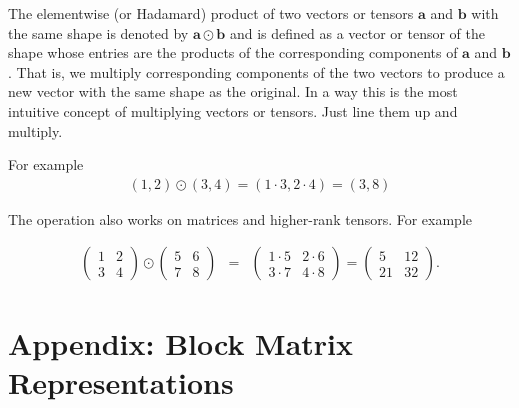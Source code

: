 The elementwise (or Hadamard) product of two vectors or tensors $\mathbf{a}$ and $\mathbf{b}$ with the same shape is denoted by $\mathbf{a} \odot \mathbf{b}$ and is defined as a vector or tensor of the shape whose entries are the products of the corresponding components of $\mathbf{a}$  and $\mathbf{b}$. That is, we multiply corresponding components of the two vectors to produce a new vector with the same shape as the original. In a way this is the most intuitive concept of multiplying vectors or tensors. Just line them up and multiply.

For example
\begin{eqnarray}
(1,2) \odot (3,4) = (1 \cdot 3,  2 \cdot 4) =  (3,8)
\end{eqnarray}

The operation also works on matrices and higher-rank tensors. For example

\begin{eqnarray}
\begin{pmatrix} 1 & 2 \\ 3 & 4 \end{pmatrix} \odot \begin{pmatrix} 5 & 6 \\ 7 & 8 \end{pmatrix} &=& \begin{pmatrix} 1 \cdot 5 & 2 \cdot 6 \\ 3 \cdot 7 & 4 \cdot 8 \end{pmatrix} = \begin{pmatrix} 5 & 12 \\ 21 & 32 \end{pmatrix}.
\end{eqnarray}


\section{Appendix: Block Matrix Representations}

